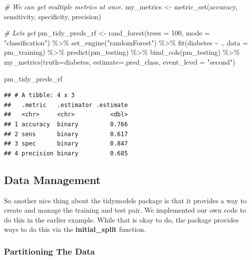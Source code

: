 \documentclass[
]{article}
\newenvironment{Shaded}{\begin{snugshade}}{\end{snugshade}}
\newcommand{\AttributeTok}[1]{\textcolor[rgb]{0.77,0.63,0.00}{#1}}
\newcommand{\CommentTok}[1]{\textcolor[rgb]{0.56,0.35,0.01}{\textit{#1}}}
\newcommand{\DecValTok}[1]{\textcolor[rgb]{0.00,0.00,0.81}{#1}}
\newcommand{\FunctionTok}[1]{\textcolor[rgb]{0.00,0.00,0.00}{#1}}
\newcommand{\NormalTok}[1]{#1}
\newcommand{\OtherTok}[1]{\textcolor[rgb]{0.56,0.35,0.01}{#1}}
\newcommand{\SpecialCharTok}[1]{\textcolor[rgb]{0.00,0.00,0.00}{#1}}
\newcommand{\StringTok}[1]{\textcolor[rgb]{0.31,0.60,0.02}{#1}}
\begin{document}
\begin{Shaded}
\begin{Highlighting}[]
\CommentTok{\# We can get multiple metrics at once.}
\NormalTok{my\_metrics }\OtherTok{\textless{}{-}} \FunctionTok{metric\_set}\NormalTok{(accuracy, sensitivity, specificity, precision)}

\CommentTok{\# Let\textquotesingle{}s get}
\NormalTok{pm\_tidy\_preds\_rf }\OtherTok{\textless{}{-}} \FunctionTok{rand\_forest}\NormalTok{(}\AttributeTok{trees =} \DecValTok{100}\NormalTok{, }\AttributeTok{mode =} \StringTok{"classification"}\NormalTok{) }\SpecialCharTok{\%\textgreater{}\%}
  \FunctionTok{set\_engine}\NormalTok{(}\StringTok{"randomForest"}\NormalTok{) }\SpecialCharTok{\%\textgreater{}\%}
  \FunctionTok{fit}\NormalTok{(diabetes }\SpecialCharTok{\textasciitilde{}}\NormalTok{ ., }\AttributeTok{data =}\NormalTok{ pm\_training) }\SpecialCharTok{\%\textgreater{}\%}
  \FunctionTok{predict}\NormalTok{(pm\_testing) }\SpecialCharTok{\%\textgreater{}\%}
  \FunctionTok{bind\_cols}\NormalTok{(pm\_testing) }\SpecialCharTok{\%\textgreater{}\%} 
  \FunctionTok{my\_metrics}\NormalTok{(}\AttributeTok{truth=}\NormalTok{diabetes, }\AttributeTok{estimate=}\NormalTok{.pred\_class, }\AttributeTok{event\_level =} \StringTok{"second"}\NormalTok{) }

\NormalTok{pm\_tidy\_preds\_rf}
\end{Highlighting}
\end{Shaded}

\begin{verbatim}
## # A tibble: 4 x 3
##   .metric   .estimator .estimate
##   <chr>     <chr>          <dbl>
## 1 accuracy  binary         0.766
## 2 sens      binary         0.617
## 3 spec      binary         0.847
## 4 precision binary         0.685
\end{verbatim}

\hypertarget{data-management}{%
\subsection{Data Management}\label{data-management}}

So another nice thing about the tidymodels package is that it provides a
way to create and manage the training and test pair. We implemented our
own code to do this in the earlier example. While that is okay to do,
the package provides ways to do this via the \textbf{initial\_split}
function.

\hypertarget{partitioning-the-data}{%
\subsubsection{Partitioning The Data}\label{partitioning-the-data}}
\end{document}
